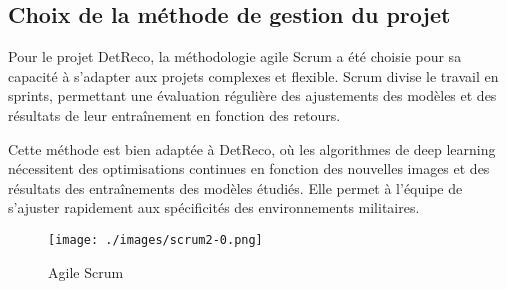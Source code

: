 \clearpage

\subsection{Choix de la méthode de gestion du projet}

Pour le projet DetReco, la méthodologie agile Scrum a été choisie pour sa capacité à s'adapter aux projets complexes et flexible.
Scrum divise le travail en sprints, permettant une évaluation régulière des ajustements des modèles et des résultats de leur entraînement en fonction des retours.

Cette méthode est bien adaptée à DetReco, où les algorithmes de deep learning nécessitent des optimisations continues en fonction des nouvelles images et des résultats des entraînements des modèles étudiés.
Elle permet à l'équipe de s'ajuster rapidement aux spécificités des environnements militaires.


\begin{figure}[h]
    \center
    \texttt{[image: ./images/scrum2-0.png]}
    \caption[Agile Scrum]{Agile Scrum \cite{exaraw2024}}\label{fig:map-train}
\end{figure}

